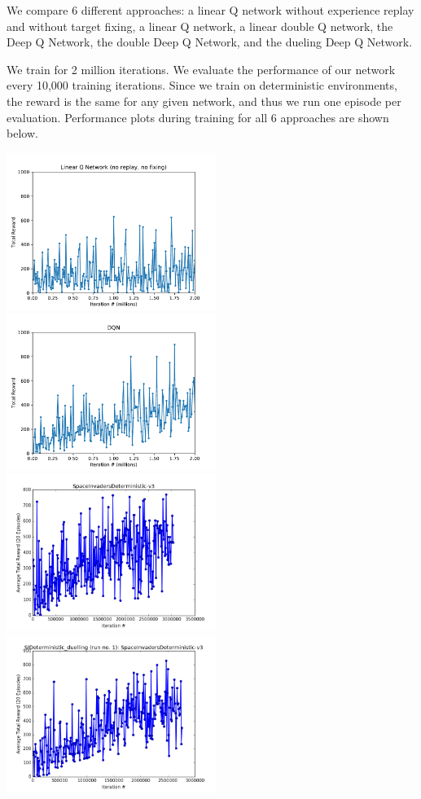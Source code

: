 \documentclass[letterpaper]{article}
\begin{document}
We compare 6 different approaches: a linear Q network without experience replay and without target fixing, a linear Q network, a linear double Q network, the Deep Q Network, the double Deep Q Network, and the dueling Deep Q Network.

We train for 2 million iterations. We evaluate the performance of our network every 10,000 training iterations. Since we train on deterministic environments, the reward is the same for any given network, and thus we run one episode per evaluation. Performance plots during training for all 6 approaches are shown below.

\begin{center}
\includegraphics[width=6.8cm]{../figs/reward_lqn_nomem.pdf}
\includegraphics[width=6.8cm]{../figs/reward_dqn.pdf}
\includegraphics[width=6.8cm]{../figs/DQN_double.png}
\includegraphics[width=6.8cm]{../figs/DQN_duelling.png}
\end{center}
\end{document}
